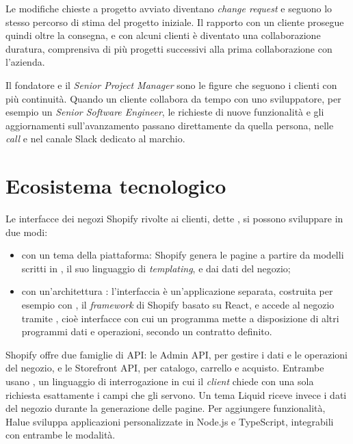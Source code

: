 Le modifiche chieste a progetto avviato diventano \emph{change request} e seguono lo stesso
percorso di stima del progetto iniziale. Il rapporto con un cliente prosegue quindi oltre la
consegna, e con alcuni clienti è diventato una collaborazione duratura, comprensiva di più progetti
successivi alla prima collaborazione con l’azienda.

Il fondatore e il \emph{Senior Project Manager} sono le figure che seguono i clienti con più
continuità. Quando un cliente collabora da tempo con uno sviluppatore, per esempio un \emph{Senior
Software Engineer}, le richieste di nuove funzionalità e gli aggiornamenti sull’avanzamento passano
direttamente da quella persona, nelle \emph{call} e nel canale Slack dedicato al marchio.

\section{Ecosistema tecnologico}
\label{sec:ecosistema}

Le interfacce dei negozi Shopify rivolte ai clienti, dette , si
possono sviluppare in due modi:

\begin{itemize}
        \item con un tema della piattaforma: Shopify genera le pagine a partire da modelli scritti in
	, il suo linguaggio di \emph{templating}, e dai dati del negozio;
        \item con un’architettura : l’interfaccia è un’applicazione
	separata, costruita per esempio con , il \emph{framework} di Shopify
	basato su React, e accede al negozio tramite , cioè interfacce con cui un
	programma mette a disposizione di altri programmi dati e operazioni, secondo un contratto definito.
\end{itemize}

Shopify offre due famiglie di API: le Admin API, per gestire i dati e le operazioni del negozio, e
le Storefront API, per catalogo, carrello e acquisto. Entrambe usano , un
linguaggio di interrogazione in cui il \emph{client} chiede con una sola richiesta esattamente i
campi che gli servono. Un tema Liquid riceve invece i dati del negozio durante la generazione delle
pagine. Per aggiungere funzionalità, Halue sviluppa applicazioni personalizzate in Node.js e
TypeScript, integrabili con entrambe le modalità.

